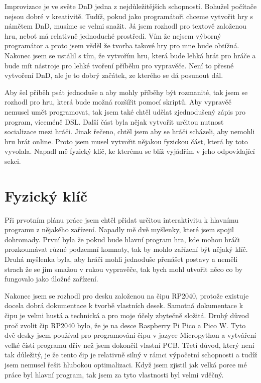 \documentclass[12pt,a4paper]{article}
\begin{document}
Improvizace je ve světe DnD jedna z nejdůležitějších schopností. Bohužel počítače nejsou dobré v kreativitě. Tudíž, pokud jako programátoři chceme vytvořit hry s námětem DnD, musíme se velmi snažit. Já jsem rozhodl pro textově založenou hru, neboť má relativně jednoduché prostředí. Vím že nejsem výborný programátor a proto jsem věděl že tvorba takové hry pro mne bude obtížná. Nakonec jsem se ustálil s tím, že vytvořím hru, která bude lehká hrát pro hráče a bude mít nástroje pro lehké tvoření příběhu pro vypravěče. Není to přesné vytvoření DnD, ale je to dobrý začátek, ze kterého se dá posunout dál.

Aby šel příběh psát jednoduše a aby mohly příběhy být rozmanité, tak jsem se rozhodl pro hru, která bude možná rozšířit pomocí skriptů. Aby vypravěč nemusel umět programovat, tak jsem také chtěl udělat zjednodušený zápis pro program, víceméně DSL. Další část byla nějak vytvořit určitou nutnost socializace mezi hráči. Jinak řečeno, chtěl jsem aby se hráči scházeli, aby nemohli hru hrát online. Proto jsem musel vytvořit nějakou fyzickou část, která by toto vyvolala. Napadl mě fyzický klíč, ke kterému se blíž vyjádřím v jeho odpovídající sekci.

\newpage
\section{Fyzický klíč}
Při prvotním plánu práce jsem chtěl přidat určitou interaktivitu k hlavnímu programu z nějakého zařízení. Napadly mě dvě myšlenky, které jsem spojil dohromady. První byla že pokud bude hlavní program hra, kde mohou hráči prozkoumávat různé podzemní komnaty, tak by mohlo zařízení být nějaký klíč. Druhá myšlenka byla, aby hráči mohli jednoduše přenášet postavy a neměli strach že se jim smažou v rukou vypravěče, tak bych mohl utvořit něco co by fungovalo jako úložné zařízení.

Nakonec jsem se rozhodl pro desku založenou na čipu RP2040, protože existuje docela dobrá dokumentace k tvorbě vlastních desek. Samotná dokumentace k čipu je velmi hustá a technická a pro moje účely zbytečně složitá. Druhý důvod proč zvolit čip RP2040 bylo, že je na desce Raspberry Pi Pico a Pico W. Tyto dvě desky jsem používal pro programování čipu v jazyce Micropython a vytváření velké čísti programu dřív než jsem dokončil vlastní PCB. Třetí důvod, který není tak důležitý, je že tento čip je relativně silný v rámci výpočetní schopnosti a tudíž jsem nemusel řešit hlubokou optimalizaci. Když jsem zjistil jak velká porce mé práce byl hlavní program, tak jsem za tyto vlastnosti byl velmi vděčný.
\end{document}
